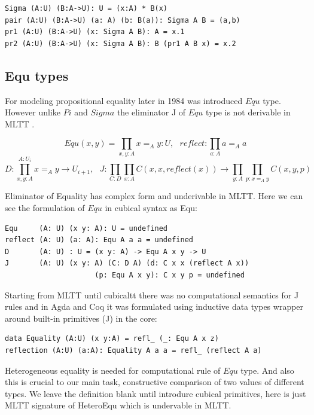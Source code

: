 \documentclass{article}
\begin{document}
\begin{lstlisting}[mathescape=true]
Sigma (A:U) (B:A->U): U = (x:A) * B(x)
pair (A:U) (B:A->U) (a: A) (b: B(a)): Sigma A B = (a,b)
pr1 (A:U) (B:A->U) (x: Sigma A B): A = x.1
pr2 (A:U) (B:A->U) (x: Sigma A B): B (pr1 A B x) = x.2
\end{lstlisting}

\subsection{Equ types}

For modeling propositional equality later in 1984 was introduced $Equ$ type. \cite{Lof84}
However unlike $Pi$ and $Sigma$ the eliminator J of $Equ$ type is
not derivable in MLTT \cite{Hofmann96, Mortberg17, HoTT}.

$$Equ(x,y) = \prod_{x,y:A} x =_A y : U,\ \ \ 
  reflect : \prod_{a:A} a =_A a$$
$$D : \prod_{x,y:A}^{A:U_i} x =_A y \rightarrow U_{i+1},\ \ \ 
  J : \prod_{C: D} \prod_{x:A} C(x,x,reflect(x)) \rightarrow \prod_{y:A} \prod_{p:x=_A y} C(x,y,p)$$

Eliminator of Equality has complex form and underivable in MLTT.
Here we can see the formulation of $Equ$ in cubical syntax as Equ:

\begin{lstlisting}[mathescape=true]
Equ     (A: U) (x y: A): U = undefined
reflect (A: U) (a: A): Equ A a a = undefined
D       (A: U) : U = (x y: A) -> Equ A x y -> U
J       (A: U) (x y: A) (C: D A) (d: C x x (reflect A x))
                     (p: Equ A x y): C x y p = undefined
\end{lstlisting}

Starting from MLTT until cubicaltt there was no computational semantics
for J rules and in Agda and Coq it was formulated using inductive data types
wrapper around built-in primitives (J) in the core:

\begin{lstlisting}[mathescape=true]
data Equality (A:U) (x y:A) = refl_ (_: Equ A x z)
reflection (A:U) (a:A): Equality A a a = refl_ (reflect A a)
\end{lstlisting}

Heterogeneous equality is needed for computational rule of $Equ$ type.
And also this is crucial to our main task, constructive
comparison of two values of different types. We leave the definition blank
until introdure cubical primitives, here is just MLTT signature of HeteroEqu
which is undervable in MLTT.
\end{document}
